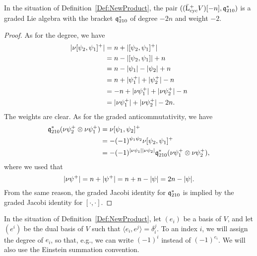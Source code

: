 \documentclass[\MainFolder/Text.tex]{subfiles}
\begin{document}
\begin{Proposition}\label{Prop:NewLieBr}
In the situation of Definition~\ref{Def:NewProduct}, the pair $((\bar{\mathrm{L}}^+_{\mathrm{cyc}} V)[-n],\mathfrak{q}_{210}^*)$ is a graded Lie algebra with the bracket $\mathfrak{q}^*_{210}$ of degree $-2n$ and weight $-2$.
\end{Proposition}
\begin{proof}
As for the degree, we have
\begin{align*}
|\mathbb{\nu} [\psi_2,\psi_1]^+| &= n+ |[\psi_2,\psi_1]^+| \\
&= n - |[\psi_2,\psi_1]|  + n \\
&= n  - |\psi_1|  - |\psi_2| + n\\
&= n + |\psi_1^+| + |\psi_2^+| - n \\
& = -n + |\mathbb{\nu} \psi_1^+| + |\mathbb{\nu} \psi_2^+| - n \\
& = |\mathbb{\nu} \psi_1^+| + |\mathbb{\nu} \psi_2^+| -2n.
\end{align*}
The weights are clear. As for the graded anticommutativity, we have 
\begin{align*}
\mathfrak{q}_{210}^*(\mathbb{\nu} \psi_2^+ \otimes \mathbb{\nu}\psi_1^+) &= \mathbb{\nu}[\psi_1,\psi_2]^+ \\
&= -(-1)^{\psi_1 \psi_2} \mathbb{\nu}[\psi_2,\psi_1]^+ \\ 
&= -(-1)^{|\mathbb{\nu}\psi_1||\mathbb{\nu}\psi_2|} \mathfrak{q}_{210}^*(\mathbb{\nu} \psi_1^+ \otimes \mathbb{\nu}\psi_2^+),
\end{align*}
where we used that 
\[ |\mathbb{\nu} \psi^+| = n + |\psi^+| = n + n - |\psi| = 2n - |\psi|. \] 
From the same reason, the graded Jacobi identity for $\mathfrak{q}_{210}^*$ is implied by the graded Jacobi identity for $[\cdot,\cdot]$.
\end{proof}

In the situation of Definition~\ref{Def:NewProduct}, let $(e_i)$ be a basis of $V$, and let $(e^i)$ be the dual basis of $V$ such that $\langle e_i, e^j \rangle= \delta_i^j$. To an index $i$, we will assign the degree of $e_i$, so that, e.g., we can write $(-1)^i$ instead of $(-1)^{e_i}$. We will also use the Einstein summation convention.
\end{document}
